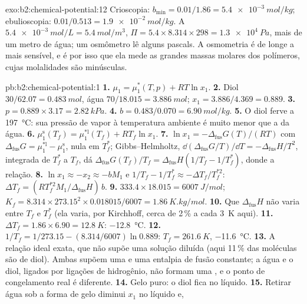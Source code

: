 \begin{solution}{exo:b2:chemical-potential:12}
Crioscopia: $b_{\min} = 0.01/1.86 = \qty{5.4e-3}{mol/kg}$; ebulioscopia:
$0.01/0.513 = \qty{1.9e-2}{mol/kg}$. A $\qty{5.4e-3}{mol/L} =
\qty{5.4}{mol/m^3}$, $\Pi = 5.4 \times 8.314 \times 298 = \qty{1.3e4}{Pa}$,
mais de um metro de água; um osmômetro lê alguns pascals. A osmometria é de
longe a mais sensível, e é por isso que ela mede as grandes massas molares
dos polímeros, cujas molalidades são minúsculas.
\end{solution}

\begin{solution}{pb:b2:chemical-potential:1}
\textbf{1.} $\mu_1 = \mu_1^*(T, p) + RT\ln x_1$.
\textbf{2.} Diol $30/62.07 = \qty{0.483}{mol}$, água $70/18.015 =
\qty{3.886}{mol}$; $x_1 = 3.886/4.369 = 0.889$.
\textbf{3.} $p = 0.889 \times 3.17 = \qty{2.82}{kPa}$.
\textbf{4.} $b = 0.483/0.070 = \qty{6.90}{mol/kg}$.
\textbf{5.} O diol ferve a \qty{197}{\celsius}: sua pressão de vapor à
temperatura ambiente é muito menor que a da água.
\textbf{6.} $\mu_1^{\text{s}}(T_f) = \mu_1^{*\text{l}}(T_f) + RT_f\ln x_1$.
\textbf{7.} $\ln x_1 = -\Delta_{\text{fus}}G(T)/(RT)$ com
$\Delta_{\text{fus}}G = \mu_1^{*\text{l}} - \mu_1^{\text{s}}$, nula em $T_f^*$;
Gibbs--Helmholtz, $\dd(\Delta_{\text{fus}}G/T)/\dd T = -\Delta_{\text{fus}}H/T^2$,
integrada de $T_f^*$ a $T_f$, dá $\Delta_{\text{fus}}G(T_f)/T_f =
\Delta_{\text{fus}}H(1/T_f - 1/T_f^*)$, donde a relação.
\textbf{8.} $\ln x_1 \approx -x_2 \approx -bM_1$ e $1/T_f - 1/T_f^* \approx
-\Delta T_f/T_f^{*2}$: $\Delta T_f = (RT_f^{*2}M_1/\Delta_{\text{fus}}H)\,b$.
\textbf{9.} $333.4 \times 18.015 = \qty{6007}{J/mol}$; $K_f = 8.314 \times
273.15^2 \times 0.018015/6007 = \qty{1.86}{K.kg/mol}$.
\textbf{10.} Que $\Delta_{\text{fus}}H$ não varia entre $T_f$ e
$T_f^*$ (ela varia, por Kirchhoff, cerca de 2\,\% a cada \qty{3}{K} aqui).
\textbf{11.} $\Delta T_f = 1.86 \times 6.90 = \qty{12.8}{K}$: \qty{-12.8}{\celsius}.
\textbf{12.} $1/T_f = 1/273.15 - (8.314/6007)\ln 0.889$: $T_f = \qty{261.6}{K}$,
\qty{-11.6}{\celsius}.
\textbf{13.} A relação ideal exata, que não supõe uma solução diluída
(aqui 11\,\% das moléculas são de diol). Ambas supõem uma 
e uma entalpia de fusão constante; a água e o diol, ligados por ligações de
hidrogênio, não formam uma , e o ponto de congelamento real é
diferente.
\textbf{14.} Gelo puro: o diol fica no líquido.
\textbf{15.} Retirar água sob a forma de gelo diminui $x_1$ no líquido e,

\end{solution}
